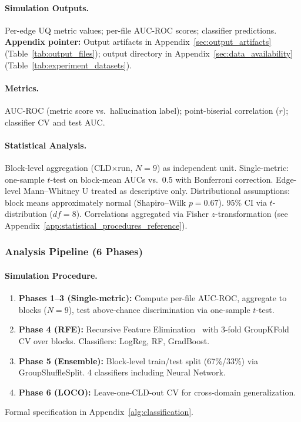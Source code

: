 \paragraph{Simulation Outputs.}
Per-edge UQ metric values; per-file AUC-ROC scores; classifier predictions.
\textbf{Appendix pointer:} Output artifacts in Appendix~\ref{sec:output_artifacts} (Table~\ref{tab:output_files}); output directory in Appendix~\ref{sec:data_availability} (Table~\ref{tab:experiment_datasets}).

\paragraph{Metrics.}
AUC-ROC (metric score vs.\ hallucination label); point-biserial correlation ($r$); classifier CV and test AUC.

\paragraph{Statistical Analysis.}
Block-level aggregation (CLD$\times$run, $N=9$) as independent unit. Single-metric: one-sample $t$-test on block-mean AUCs vs.\ 0.5 with Bonferroni correction. Edge-level Mann--Whitney U treated as descriptive only. Distributional assumptions: block means approximately normal (Shapiro--Wilk $p=0.67$). 95\% CI via $t$-distribution ($df=8$). Correlations aggregated via Fisher $z$-transformation (see Appendix~\ref{app:statistical_procedures_reference}).

\subsubsection{Analysis Pipeline (6 Phases)}
\label{sec:rq2_analysis}

\paragraph{Simulation Procedure.}
\begin{enumerate}[noitemsep]
    \item \textbf{Phases 1--3 (Single-metric):} Compute per-file AUC-ROC, aggregate to blocks ($N=9$), test above-chance discrimination via one-sample $t$-test.
    \item \textbf{Phase 4 (RFE):} Recursive Feature Elimination~\cite{pedregosa2011sklearn} with 3-fold GroupKFold CV over blocks. Classifiers: LogReg, RF, GradBoost.
    \item \textbf{Phase 5 (Ensemble):} Block-level train/test split (67\%/33\%) via GroupShuffleSplit. 4 classifiers including Neural Network.
    \item \textbf{Phase 6 (LOCO):} Leave-one-CLD-out CV for cross-domain generalization.
\end{enumerate}
Formal specification in Appendix~\ref{alg:classification}.

